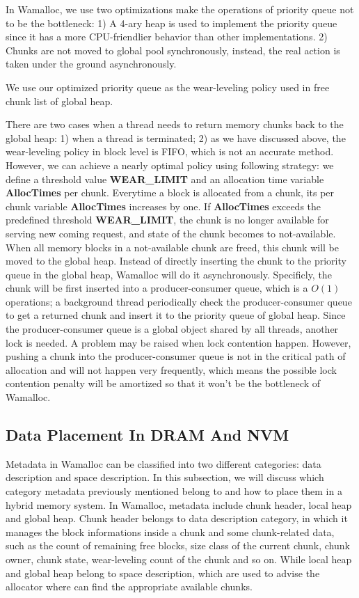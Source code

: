 \documentclass[10pt, conference, compsocconf]{IEEEtran}
\begin{document}
In Wamalloc, we use two optimizations make the operations of priority queue not to be the bottleneck:
1) A 4-ary heap is used to implement the priority queue since it has a more CPU-friendlier behavior than other implementations.
2) Chunks are not moved to global pool synchronously, instead, the real action is taken under the ground asynchronously.

We use our optimized priority queue as the wear-leveling policy used in free chunk list of global heap.

There are two cases when a thread needs to return memory chunks back to the global heap: 
1) when a thread is terminated;
2) as we have discussed above, the wear-leveling policy in block level is FIFO, which is not an accurate method.
However, we can achieve a nearly optimal policy using following strategy: 
we define a threshold value \textbf{WEAR\_LIMIT} and an allocation time variable \textbf{AllocTimes} per chunk. 
Everytime a block is allocated from a chunk, its per chunk variable \textbf{AllocTimes} increases by one.
If \textbf{AllocTimes} exceeds the predefined threshold \textbf{WEAR\_LIMIT}, 
the chunk is no longer available for serving new coming request, 
and state of the chunk becomes to not-available.
When all memory blocks in a not-available chunk are freed, 
this chunk will be moved to the global heap.
Instead of directly inserting the chunk to the priority queue in the global heap, Wamalloc will do it asynchronously.
Specificly, the chunk will be first inserted into a producer-consumer queue, which is a $O(1)$ operations;
a background thread periodically check the producer-consumer queue to get a returned chunk 
and insert it to the priority queue of global heap.
Since the producer-consumer queue is a global object shared by all threads, another lock is needed.
A problem may be raised when lock contention happen.
However, pushing a chunk into the producer-consumer queue is not in the critical path of allocation 
and will not happen very frequently,
which means the possible lock contention penalty will be amortized so that it won't be the bottleneck of Wamalloc.

\subsection{Data Placement In DRAM And NVM}

Metadata in Wamalloc can be classified into two different categories: data description and space description.
In this subsection, we will discuss which category metadata previously mentioned belong to
and how to place them in a hybrid memory system.
In Wamalloc, metadata include chunk header, local heap and global heap.
Chunk header belongs to data description category, 
in which it manages the block informations inside a chunk and some chunk-related data, 
such as the count of remaining free blocks, size class of the current chunk,
chunk owner, chunk state, wear-leveling count of the chunk and so on.
While local heap and global heap belong to space description,
which are used to advise the allocator where can find the appropriate available chunks.
\end{document}
